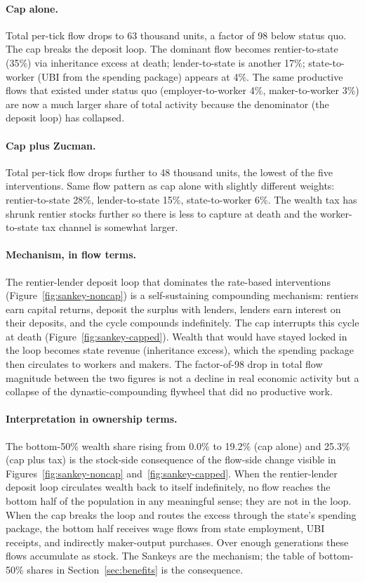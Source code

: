 \documentclass[11pt]{article}
\begin{document}
\paragraph{Cap alone.}  Total per-tick flow drops to 63 thousand
units, a factor of 98 below status quo.  The cap breaks the
deposit loop.  The dominant flow becomes rentier-to-state (35\%)
via inheritance excess at death; lender-to-state is another
17\%; state-to-worker (UBI from the spending package) appears at
4\%.  The same productive flows that existed under status quo
(employer-to-worker 4\%, maker-to-worker 3\%) are now a much
larger share of total activity because the denominator (the
deposit loop) has collapsed.

\paragraph{Cap plus Zucman.}  Total per-tick flow drops further
to 48 thousand units, the lowest of the five interventions.
Same flow pattern as cap alone with slightly different weights:
rentier-to-state 28\%, lender-to-state 15\%, state-to-worker 6\%.
The wealth tax has shrunk rentier stocks further so there is less
to capture at death and the worker-to-state tax channel is
somewhat larger.

\paragraph{Mechanism, in flow terms.}  The rentier-lender deposit
loop that dominates the rate-based interventions
(Figure~\ref{fig:sankey-noncap}) is a self-sustaining compounding
mechanism: rentiers earn capital returns, deposit the surplus
with lenders, lenders earn interest on their deposits, and the
cycle compounds indefinitely.  The cap interrupts this cycle at
death (Figure~\ref{fig:sankey-capped}).  Wealth that would have
stayed locked in the loop becomes state revenue (inheritance
excess), which the spending package then circulates to workers
and makers.  The factor-of-98 drop in total flow magnitude
between the two figures is not a decline in real economic
activity but a collapse of the dynastic-compounding flywheel
that did no productive work.

\paragraph{Interpretation in ownership terms.}  The bottom-50\%
wealth share rising from 0.0\% to 19.2\% (cap alone) and 25.3\%
(cap plus tax) is the stock-side consequence of the flow-side
change visible in Figures~\ref{fig:sankey-noncap}
and~\ref{fig:sankey-capped}.  When the rentier-lender deposit
loop circulates wealth back to itself indefinitely, no flow
reaches the bottom half of the population in any meaningful
sense; they are not in the loop.  When the cap breaks the loop
and routes the excess through the state's spending package, the
bottom half receives wage flows from state employment, UBI
receipts, and indirectly maker-output purchases.  Over enough
generations these flows accumulate as stock.  The Sankeys are the
mechanism; the table of bottom-50\% shares in
Section~\ref{sec:benefits} is the consequence.
\end{document}
